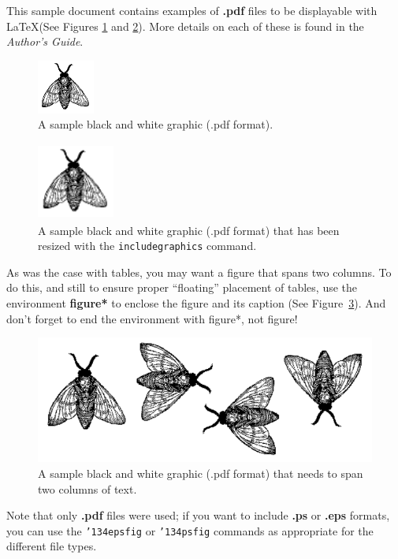 \documentclass{vldb}
\begin{document}
This sample document contains examples of \textbf{.pdf} files to be
displayable with \LaTeX (See Figures \ref{fig:fly} and \ref{fig:bigfly}).  More details on each of these is found in the
\textit{Author's Guide}.

\begin{figure}
\centering
\includegraphics{fly}
\caption{A sample black and white graphic (.pdf format).}
\label{fig:fly}
\end{figure}

\begin{figure}
\centering
\includegraphics[width=1in,height=1in]{fly}
\caption{A sample black and white graphic (.pdf format)
that has been resized with the \texttt{includegraphics} command.}
\label{fig:bigfly}
\end{figure}


As was the case with tables, you may want a figure
that spans two columns.  To do this, and still to
ensure proper ``floating'' placement of tables, use the environment
\textbf{figure*} to enclose the figure and its caption (See Figure~\ref{fig:flies}). And don't forget to end the environment with {figure*}, not {figure}!

\begin{figure}
\centering
\includegraphics{flies}
\caption{A sample black and white graphic (.pdf format)
that needs to span two columns of text.}
\label{fig:flies}
\end{figure}


Note that only {\textbf{.pdf}} files were used; if you want to include
{\textbf{.ps}} or {\textbf{.eps}} formats, you can use the
\texttt{{\char'134}epsfig} or \texttt{{\char'134}psfig}
commands as appropriate for the different file types.
\end{document}

